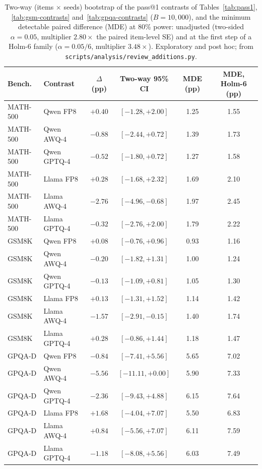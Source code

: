\documentclass[11pt,a4paper]{article}
\begin{document}
\begin{table}[!htbp]
\centering
\caption{Two-way (items $\times$ seeds) bootstrap of the pass@1 contrasts of Tables~\ref{tab:pass1}, \ref{tab:gsm-contrasts} and~\ref{tab:gpqa-contrasts} ($B=10{,}000$), and the minimum detectable paired difference (MDE) at 80\% power: unadjusted (two-sided $\alpha=0.05$, multiplier $2.80\times$ the paired item-level SE) and at the first step of a Holm-6 family ($\alpha=0.05/6$, multiplier $3.48\times$). Exploratory and post hoc; from \texttt{scripts/analysis/review\_additions.py}.}
\label{tab:twoway}
\small
\setlength{\tabcolsep}{4pt}
\begin{tabular}{llcccc}
\toprule
\textbf{Bench.} & \textbf{Contrast} & $\Delta$ (pp) & \textbf{Two-way 95\% CI} & \textbf{MDE (pp)} & \textbf{MDE, Holm-6 (pp)} \\
\midrule
MATH-500 & Qwen FP8 & $+0.40$ & $[-1.28,+2.00]$ & 1.25 & 1.55 \\
MATH-500 & Qwen AWQ-4 & $-0.88$ & $[-2.44,+0.72]$ & 1.39 & 1.73 \\
MATH-500 & Qwen GPTQ-4 & $-0.52$ & $[-1.80,+0.72]$ & 1.27 & 1.58 \\
MATH-500 & Llama FP8 & $+0.28$ & $[-1.68,+2.32]$ & 1.69 & 2.10 \\
MATH-500 & Llama AWQ-4 & $-2.76$ & $[-4.96,-0.68]$ & 1.97 & 2.45 \\
MATH-500 & Llama GPTQ-4 & $-0.32$ & $[-2.76,+2.00]$ & 1.79 & 2.22 \\
\midrule
GSM8K & Qwen FP8 & $+0.08$ & $[-0.76,+0.96]$ & 0.93 & 1.16 \\
GSM8K & Qwen AWQ-4 & $-0.20$ & $[-1.82,+1.31]$ & 1.00 & 1.24 \\
GSM8K & Qwen GPTQ-4 & $-0.13$ & $[-1.09,+0.81]$ & 1.05 & 1.30 \\
GSM8K & Llama FP8 & $+0.13$ & $[-1.31,+1.52]$ & 1.14 & 1.42 \\
GSM8K & Llama AWQ-4 & $-1.57$ & $[-2.91,-0.15]$ & 1.40 & 1.74 \\
GSM8K & Llama GPTQ-4 & $+0.28$ & $[-0.86,+1.44]$ & 1.18 & 1.47 \\
\midrule
GPQA-D & Qwen FP8 & $-0.84$ & $[-7.41,+5.56]$ & 5.65 & 7.02 \\
GPQA-D & Qwen AWQ-4 & $-5.56$ & $[-11.11,+0.00]$ & 5.90 & 7.33 \\
GPQA-D & Qwen GPTQ-4 & $-2.36$ & $[-9.43,+4.88]$ & 6.15 & 7.64 \\
GPQA-D & Llama FP8 & $+1.68$ & $[-4.04,+7.07]$ & 5.50 & 6.83 \\
GPQA-D & Llama AWQ-4 & $+0.84$ & $[-5.56,+7.07]$ & 6.11 & 7.59 \\
GPQA-D & Llama GPTQ-4 & $-1.18$ & $[-8.08,+5.56]$ & 6.03 & 7.49 \\
\bottomrule
\end{tabular}
\end{table}
\end{document}
